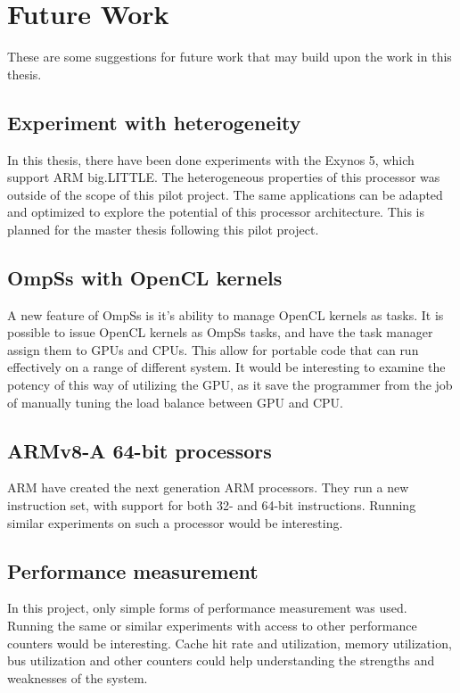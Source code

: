 \chapter[Future Work]{Future Work}
These are some suggestions for future work that may build upon the work in this thesis.

\section{Experiment with heterogeneity}
In this thesis, there have been done experiments with the Exynos 5, which support ARM big.LITTLE.
The heterogeneous properties of this processor was outside of the scope of this pilot project.
The same applications can be adapted and optimized to explore the potential of this processor architecture.
This is planned for the master thesis following this pilot project.

\section{OmpSs with OpenCL kernels}
A new feature of OmpSs is it's ability to manage OpenCL kernels as tasks.
It is possible to issue OpenCL kernels as OmpSs tasks, and have the task manager assign them to GPUs and CPUs.
This allow for portable code that can run effectively on a range of different system.
It would be interesting to examine the potency of this way of utilizing the GPU, as it save the programmer from the job of manually tuning the load balance between GPU and CPU.

\section{ARMv8-A 64-bit processors}
ARM have created the next generation ARM processors.
They run a new instruction set, with support for both 32- and 64-bit instructions.
Running similar experiments on such a processor would be interesting.

\section{Performance measurement}
In this project, only simple forms of performance measurement was used.
Running the same or similar experiments with access to other performance counters would be interesting.
Cache hit rate and utilization, memory utilization, bus utilization and other counters could help understanding the strengths and weaknesses of the system.

